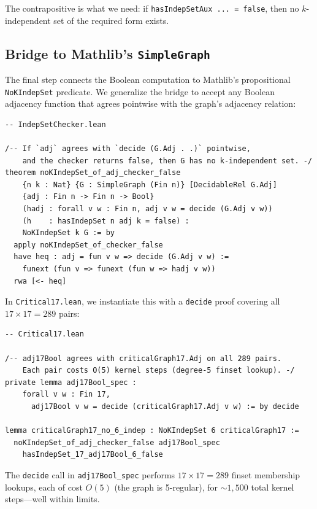\documentclass[11pt]{article}
\newcommand{\lean}[1]{\texttt{#1}}
\begin{document}
\noindent
The contrapositive is what we need: if \lean{hasIndepSetAux~...~= false},
then no $k$-independent set of the required form exists.

\subsection{Bridge to Mathlib's \texttt{SimpleGraph}}
\label{sec:checker:bridge}

The final step connects the Boolean computation to Mathlib's propositional
\lean{NoKIndepSet} predicate.
We generalize the bridge to accept any Boolean adjacency function that agrees
pointwise with the graph's adjacency relation:

\begin{lstlisting}
-- IndepSetChecker.lean

/-- If `adj` agrees with `decide (G.Adj . .)` pointwise,
    and the checker returns false, then G has no k-independent set. -/
theorem noKIndepSet_of_adj_checker_false
    {n k : Nat} {G : SimpleGraph (Fin n)} [DecidableRel G.Adj]
    {adj : Fin n -> Fin n -> Bool}
    (hadj : forall v w : Fin n, adj v w = decide (G.Adj v w))
    (h    : hasIndepSet n adj k = false) :
    NoKIndepSet k G := by
  apply noKIndepSet_of_checker_false
  have heq : adj = fun v w => decide (G.Adj v w) :=
    funext (fun v => funext (fun w => hadj v w))
  rwa [<- heq]
\end{lstlisting}

\noindent
In \texttt{Critical17.lean}, we instantiate this with a \lean{decide}
proof covering all $17 \times 17 = 289$ pairs:

\begin{lstlisting}
-- Critical17.lean

/-- adj17Bool agrees with criticalGraph17.Adj on all 289 pairs.
    Each pair costs O(5) kernel steps (degree-5 finset lookup). -/
private lemma adj17Bool_spec :
    forall v w : Fin 17,
      adj17Bool v w = decide (criticalGraph17.Adj v w) := by decide

lemma criticalGraph17_no_6_indep : NoKIndepSet 6 criticalGraph17 :=
  noKIndepSet_of_adj_checker_false adj17Bool_spec
    hasIndepSet_17_adj17Bool_6_false
\end{lstlisting}

\noindent
The \lean{decide} call in \lean{adj17Bool\_spec} performs
$17 \times 17 = 289$ finset membership lookups, each of cost $O(5)$
(the graph is 5-regular), for $\sim\!1{,}500$ total kernel steps---well
within limits.
\end{document}
